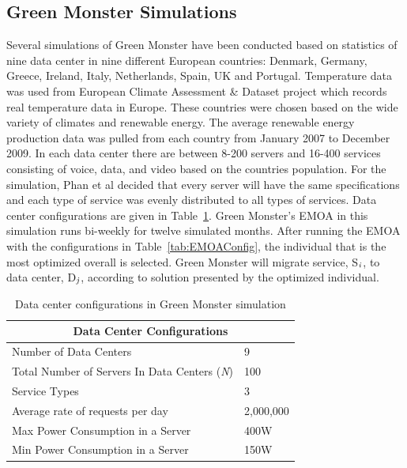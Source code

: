 \documentclass{sig-alternate}
\begin{document}
\subsection{Green Monster Simulations}
\label{sec:GMSims}
 
Several simulations of Green Monster have been conducted based on statistics of nine data center in nine different European countries: Denmark, Germany, Greece, Ireland, Italy, Netherlands, Spain, UK and Portugal. Temperature data was used from European Climate Assessment \& Dataset project which records real temperature data in Europe. These countries were chosen based on the wide variety of climates and renewable energy. The average renewable energy production data was pulled from each country from January 2007 to December 2009. In each data center there are between 8-200 servers and 16-400 services consisting of voice, data, and video based on the countries population. For the simulation, Phan et al decided that every server will have the same specifications and each type of service was evenly distributed to all types of services. Data center configurations are given in Table~\ref{tab:DCConfig}.  Green Monster's EMOA in this simulation runs bi-weekly for twelve simulated months. After running the EMOA with the configurations in Table~\ref{tab:EMOAConfig}, the individual that is the most optimized overall is selected. Green Monster will migrate service, S$_{\text{\emph{i}}}$, to data center, D$_{\text{\emph{j}}}$, according to solution presented by the optimized individual.

\begin{table}[tb]
\begin{center}
\begin{tabular}{|l|l|}
    \hline
    \multicolumn{2}{|c|}{\textbf{Data Center Configurations}} \\
    \hline
    Number of Data Centers & 9 \\
    Total Number of Servers In Data Centers (\emph{N}) & 100 \\
    Service Types & 3 \\
    Average rate of requests per day & 2,000,000 \\
    Max Power Consumption in a Server & 400W \\
   	Min Power Consumption in a Server & 150W\\
    \hline
\end{tabular}
\caption{Data center configurations in Green Monster simulation}
\label{tab:DCConfig}
\end{center}
\end{table}
\end{document}
